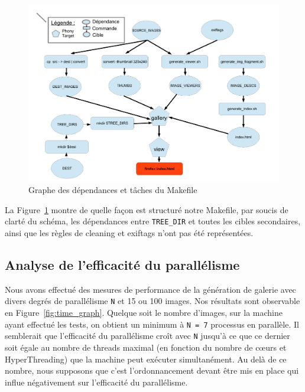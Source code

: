 \documentclass[10.9pt]{article}
\begin{document}
\begin{figure}[!h]
\begin{center}
  \includegraphics[width=10 cm]{makefile_graph.pdf}
  \caption{Graphe des dépendances et tâches du Makefile}
\end{center}
\label{fig:makefile_graph}
\end{figure}

La Figure~\ref{fig:makefile_graph} montre de quelle façon est
structuré notre Makefile, par soucis de clarté du schéma, les dépendances entre
\lstinline!TREE_DIR! et toutes les cibles secondaires, ainsi que les
règles de cleaning et exiftags n'ont pas été représentées.

\subsection{Analyse de l'efficacité du parallélisme}

Nous avons effectué des mesures de performance de la génération de
galerie avec divers degrés de parallélisme \lstinline!N! 
et 15 ou 100 images. Nos
résultats sont observable en Figure~\ref{fig:time_graph}. 
Quelque soit le nombre d'images, sur la machine ayant effectué les
tests, on obtient un minimum à \lstinline!N = 7! processus en
parallèle. Il semblerait que l'efficacité du parallélisme croît
avec \lstinline!N! jusqu'à ce que ce dernier soit égale au nombre de
threads maximal (en fonction du nombre de cœurs et HyperThreading) 
que la machine peut exécuter simultanément. Au delà de ce nombre, nous
supposons que c'est l'ordonnancement devant être mis en place qui influe
négativement sur l'efficacité du parallélisme.\\   
\end{document}
